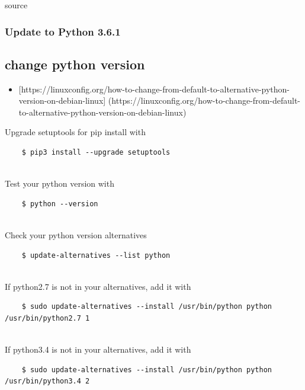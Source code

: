 source

\subsubsection{Update to Python 3.6.1}\label{update-to-python-3.6.1}

\subsection{change python version}\label{change-python-version}

\begin{itemize}
\tightlist
\item
  {[}https://linuxconfig.org/how-to-change-from-default-to-alternative-python-version-on-debian-linux{]}
  (https://linuxconfig.org/how-to-change-from-default-to-alternative-python-version-on-debian-linux)
\end{itemize}

Upgrade setuptools for pip install with

\begin{verbatim}
    $ pip3 install --upgrade setuptools
    
\end{verbatim}

Test your python version with

\begin{verbatim}
    $ python --version
    
\end{verbatim}

Check your python version alternatives

\begin{verbatim}
    $ update-alternatives --list python
    
\end{verbatim}

If python2.7 is not in your alternatives, add it with

\begin{verbatim}
    $ sudo update-alternatives --install /usr/bin/python python /usr/bin/python2.7 1
    
\end{verbatim}

If python3.4 is not in your alternatives, add it with

\begin{verbatim}
    $ sudo update-alternatives --install /usr/bin/python python /usr/bin/python3.4 2
    
\end{verbatim}

